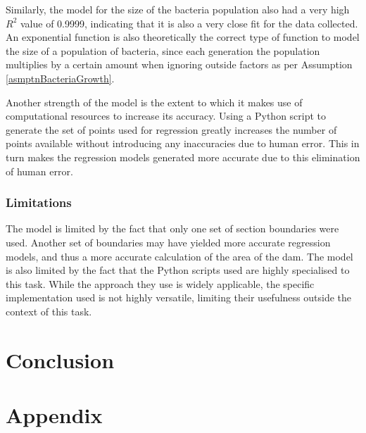 \documentclass[a4paper]{article}
\theoremstyle{definition}
\begin{document}
            Similarly, the model for the size of the bacteria population also had a very high $R^2$ value of 0.9999, indicating that it is also a very close fit for the data collected. An exponential function is also theoretically the correct type of function to model the size of a population of bacteria, since each generation the population multiplies by a certain amount when ignoring outside factors as per Assumption \ref{asmptnBacteriaGrowth}.

            Another strength of the model is the extent to which it makes use of computational resources to increase its accuracy. Using a Python script to generate the set of points used for regression greatly increases the number of points available without introducing any inaccuracies due to human error. This in turn makes the regression models generated more accurate due to this elimination of human error. 


        \subsubsection{Limitations}
            The model is limited by the fact that only one set of section boundaries were used. Another set of boundaries may have yielded more accurate regression models, and thus a more accurate calculation of the area of the dam. 
            The model is also limited by the fact that the Python scripts used are highly specialised to this task. While the approach they use is widely applicable, the specific implementation used is not highly versatile, limiting their usefulness outside the context of this task.

\section{Conclusion}


\newpage

\section{Appendix}
\end{document}
